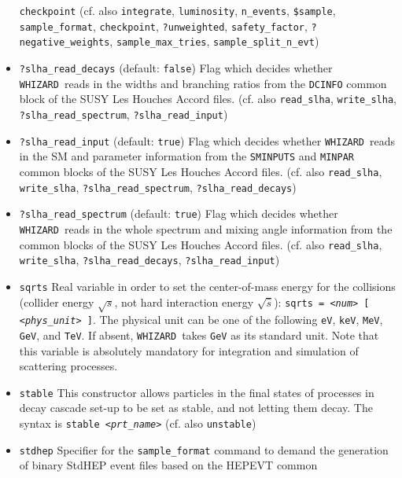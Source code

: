 \documentclass[12pt]{book}
\newcommand{\ttt}[1]{\texttt{#1}}
\newcommand{\whizard}{\texttt{WHIZARD}}
\begin{document}
\begin{itemize}
\ttt{checkpoint} (cf. also \ttt{integrate}, \ttt{luminosity},
\ttt{n\_events}, \ttt{\$sample}, \ttt{sample\_format},
\ttt{checkpoint}, \ttt{?unweighted}, \ttt{safety\_factor},
\ttt{?negative\_weights}, \ttt{sample\_max\_tries}, \ttt{sample\_split\_n\_evt})
\item
\ttt{?slha\_read\_decays} \qquad (default: \ttt{false}) \newline
Flag which decides whether \whizard\ reads in the widths and branching
ratios from the \ttt{DCINFO} common block of the SUSY Les Houches
Accord files. (cf. also \ttt{read\_slha}, \ttt{write\_slha},
\ttt{?slha\_read\_spectrum}, 
\ttt{?slha\_read\_input}) 
\item
\ttt{?slha\_read\_input} \qquad (default: \ttt{true}) \newline
Flag which decides whether \whizard\ reads in the SM
and parameter information from the \ttt{SMINPUTS} and \ttt{MINPAR}
common blocks of the SUSY Les Houches Accord files. (cf. also
\ttt{read\_slha}, \ttt{write\_slha}, \ttt{?slha\_read\_spectrum},
\ttt{?slha\_read\_decays})
\item
\ttt{?slha\_read\_spectrum} \qquad (default: \ttt{true}) \newline
Flag which decides whether \whizard\ reads in the whole spectrum and
mixing angle information from the common blocks of the SUSY Les
Houches Accord files. (cf. also \ttt{read\_slha}, \ttt{write\_slha},
\ttt{?slha\_read\_decays}, \ttt{?slha\_read\_input})  
\item
\ttt{sqrts} \newline
Real variable in order to set the center-of-mass energy for the
collisions (collider energy $\sqrt{s}$, not hard interaction energy 
$\sqrt{\hat{s}}$): \ttt{sqrts = {\em <num>} [ {\em <phys\_unit>} ]}. The physical unit
can be one of the following \ttt{eV}, \ttt{keV}, \ttt{MeV}, \ttt{GeV},
and \ttt{TeV}. If absent, \whizard\ takes \ttt{GeV} as its standard
unit. Note that this variable is absolutely mandatory for integration
and simulation of scattering processes.
\item
\ttt{stable} \newline
This constructor allows particles in the final states of processes in
decay cascade set-up to be set as stable, and not letting them
decay. The syntax is \ttt{stable {\em <prt\_name>}} (cf. also \ttt{unstable}) 
\item
\ttt{stdhep} \newline 
Specifier for the \ttt{sample\_format} command to demand the
generation of binary StdHEP event files based on the HEPEVT common

\end{itemize}
\end{document}
